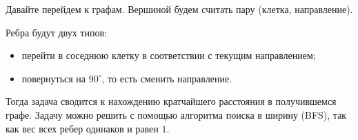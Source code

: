\solutionSection

Давайте перейдем к графам. Вершиной будем считать пару (клетка, направление).

Ребра будут двух типов:

\begin{itemize}
\item перейти в соседнюю клетку в соответствии с текущим направлением;
\item повернуться на $90^{\circ}$, то есть сменить направление.
\end{itemize}

Тогда задача сводится к нахождению кратчайшего расстояния в получившемся графе.
Задачу можно решить с помощью алгоритма поиска в ширину (BFS), так как вес всех ребер одинаков и равен $1$.

\codeExample

